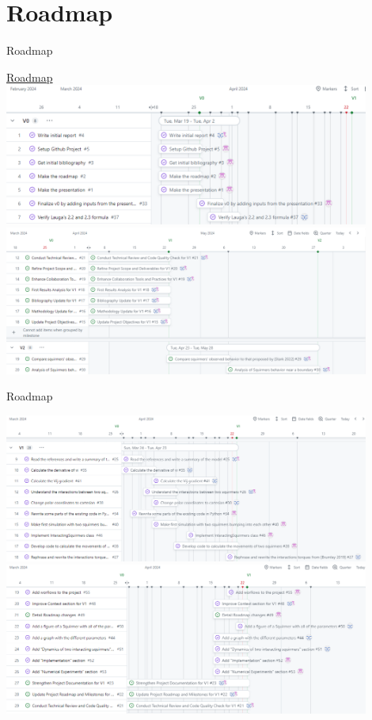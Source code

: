 \documentclass{beamer}
\begin{document}
\section{Roadmap}
\begin{frame}{Roadmap}
    \begin{center}
        \href{https://github.com/orgs/master-csmi/projects/23/views/2}{Roadmap}
        \includegraphics[width=0.9\textwidth]{../images/roadmapV0_1.png}
        \vspace{1em}
        \includegraphics[width=0.9\textwidth]{../images/roadmapV0_2.png}
    \end{center}
\end{frame}
\begin{frame}{Roadmap}
    \begin{center}
        \includegraphics[width=0.9\textwidth]{../images/roadmapV1_1.png}
        \vspace{1em}
        \includegraphics[width=0.9\textwidth]{../images/roadmapV1_2.png}
    \end{center}
\end{frame}
\end{document}
